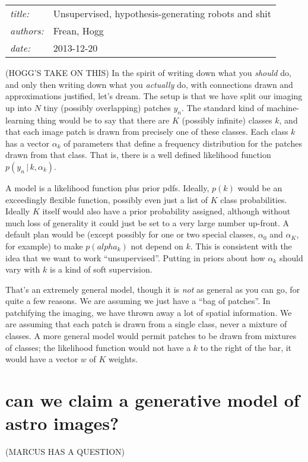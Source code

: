 \documentclass[12pt]{article}
\newcommand{\given}{\,|\,}
\begin{document}
\sloppy\sloppypar

\noindent
\begin{tabular}{ll}
\textsl{title:} & Unsupervised, hypothesis-generating robots and shit \\
\textsl{authors:} & Frean, Hogg \\
\textsl{date:}    & 2013-12-20
\end{tabular}
\bigskip

(HOGG'S TAKE ON THIS)
In the spirit of writing down what you \emph{should} do,
  and only then writing down what you \emph{actually} do,
  with connections drawn and approximations justified,
  let's dream.
The setup is that we have split our imaging up into $N$ tiny
  (possibly overlapping) patches $y_n$.
The standard kind of machine-learning thing would be to
  say that there are $K$ (possibly infinite) classes $k$,
  and that each image patch is drawn from precisely one of these classes.
Each class $k$ has a vector $\alpha_k$ of parameters
  that define a frequency distribution
  for the patches drawn from that class.
That is, there is a well defined likelihood function $p(y_n\given k, \alpha_k)$.

A model is a likelihood function plus prior pdfs.
Ideally, $p(k)$ would be an exceedingly flexible function,
  possibly even just a list of $K$ class probabilities.
Ideally $K$ itself would also have a prior probability assigned,
  although without much loss of generality
  it could just be set to a very large number up-front.
A default plan would be 
  (except possibly for one or two special classes,
   $\alpha_0$ and $\alpha_K$, for example)
  to make $p(alpha_k)$ not depend on $k$.
This is consistent with the idea that we want to work ``unsupervised''.
Putting in priors about how $\alpha_k$ should vary with $k$ is a kind of soft supervision.

That's an extremely general model,
  though it is \emph{not} as general as you can go,
  for quite a few reasons.
We are assuming we just have a ``bag of patches''.
In patchifying the imaging, we have thrown away a lot of spatial information.
We are assuming that each patch is drawn from a single class,
  never a mixture of classes.
A more general model would permit patches to be drawn from mixtures of classes;
  the likelihood function would not have a $k$ to the right of the bar,
  it would have a vector $w$ of $K$ weights.

\section{can we claim a generative model of astro images?}
(MARCUS HAS A QUESTION)
\end{document}
